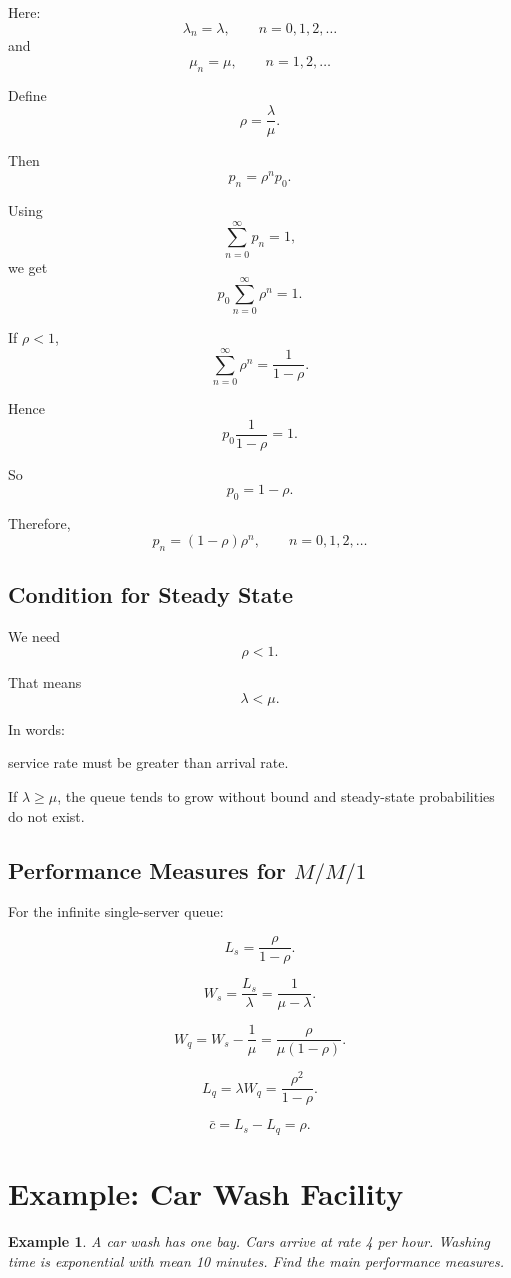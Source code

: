 \documentclass[12pt]{article}
\newtheorem{example}{Example}
\begin{document}
Here:
\[
\lambda_n=\lambda,\qquad n=0,1,2,\ldots
\]
and
\[
\mu_n=\mu,\qquad n=1,2,\ldots
\]

Define
\[
\rho=\frac{\lambda}{\mu}.
\]

Then
\[
p_n=\rho^np_0.
\]

Using
\[
\sum_{n=0}^{\infty}p_n=1,
\]
we get
\[
p_0\sum_{n=0}^{\infty}\rho^n=1.
\]

If \(\rho<1\),
\[
\sum_{n=0}^{\infty}\rho^n=\frac{1}{1-\rho}.
\]

Hence
\[
p_0\frac{1}{1-\rho}=1.
\]

So
\[
p_0=1-\rho.
\]

Therefore,
\[
\boxed{
p_n=(1-\rho)\rho^n,\qquad n=0,1,2,\ldots
}
\]

\subsection*{Condition for Steady State}

We need
\[
\rho<1.
\]

That means
\[
\lambda<\mu.
\]

In words:

\begin{center}
service rate must be greater than arrival rate.
\end{center}

If \(\lambda\geq\mu\), the queue tends to grow without bound and steady-state probabilities do not exist.

\subsection*{Performance Measures for \(M/M/1\)}

For the infinite single-server queue:

\[
\boxed{
L_s=\frac{\rho}{1-\rho}.
}
\]

\[
\boxed{
W_s=\frac{L_s}{\lambda}=\frac{1}{\mu-\lambda}.
}
\]

\[
\boxed{
W_q=W_s-\frac1{\mu}
=
\frac{\rho}{\mu(1-\rho)}.
}
\]

\[
\boxed{
L_q=\lambda W_q
=
\frac{\rho^2}{1-\rho}.
}
\]

\[
\boxed{
\bar{c}=L_s-L_q=\rho.
}
\]

\section{Example: Car Wash Facility}

\begin{example}
A car wash has one bay. Cars arrive at rate 4 per hour. Washing time is exponential with mean 10 minutes. Find the main performance measures.
\end{example}
\end{document}
